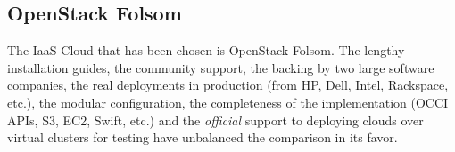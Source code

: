 \subsection{OpenStack Folsom}\label{subsec:openstackfolsom}
\noindent The IaaS Cloud that has been chosen is OpenStack Folsom. The lengthy installation guides, the community support, the backing by two large software companies, the real deployments in production (from HP, Dell, Intel, Rackspace, etc.), the modular configuration, the completeness of the implementation (OCCI APIs, S3, EC2, Swift, etc.) and the \emph{official} support to deploying clouds over virtual clusters for testing have unbalanced the comparison in its favor.

